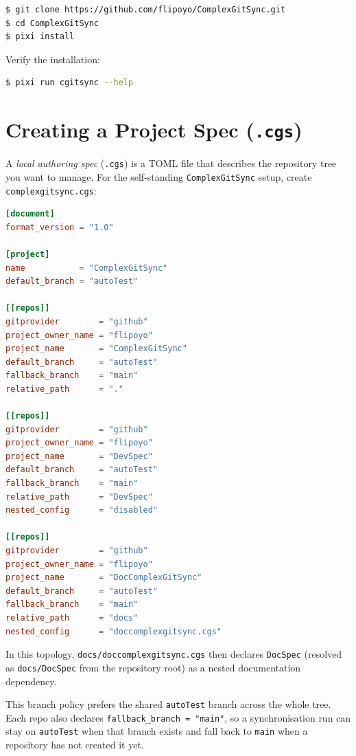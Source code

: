 \begin{lstlisting}[language=bash]
$ git clone https://github.com/flipoyo/ComplexGitSync.git
$ cd ComplexGitSync
$ pixi install
\end{lstlisting}

Verify the installation:

\begin{lstlisting}[language=bash]
$ pixi run cgitsync --help
\end{lstlisting}

\section{Creating a Project Spec (\texttt{.cgs})}

A \emph{local authoring spec} (\texttt{.cgs}) is a TOML file that describes
the repository tree you want to manage. For the self-standing
\texttt{ComplexGitSync} setup, create \texttt{complexgitsync.cgs}:

\begin{lstlisting}[language=toml]
[document]
format_version = "1.0"

[project]
name           = "ComplexGitSync"
default_branch = "autoTest"

[[repos]]
gitprovider        = "github"
project_owner_name = "flipoyo"
project_name       = "ComplexGitSync"
default_branch     = "autoTest"
fallback_branch    = "main"
relative_path      = "."

[[repos]]
gitprovider        = "github"
project_owner_name = "flipoyo"
project_name       = "DevSpec"
default_branch     = "autoTest"
fallback_branch    = "main"
relative_path      = "DevSpec"
nested_config      = "disabled"

[[repos]]
gitprovider        = "github"
project_owner_name = "flipoyo"
project_name       = "DocComplexGitSync"
default_branch     = "autoTest"
fallback_branch    = "main"
relative_path      = "docs"
nested_config      = "doccomplexgitsync.cgs"
\end{lstlisting}

In this topology, \texttt{docs/doccomplexgitsync.cgs} then declares
\texttt{DocSpec} (resolved as \texttt{docs/DocSpec}
from the repository root) as a nested documentation dependency.

This branch policy prefers the shared \texttt{autoTest} branch across the
whole tree. Each repo also declares \texttt{fallback\_branch = "main"}, so a
synchronisation run can stay on \texttt{autoTest} when that branch exists and
fall back to \texttt{main} when a repository has not created it yet.

